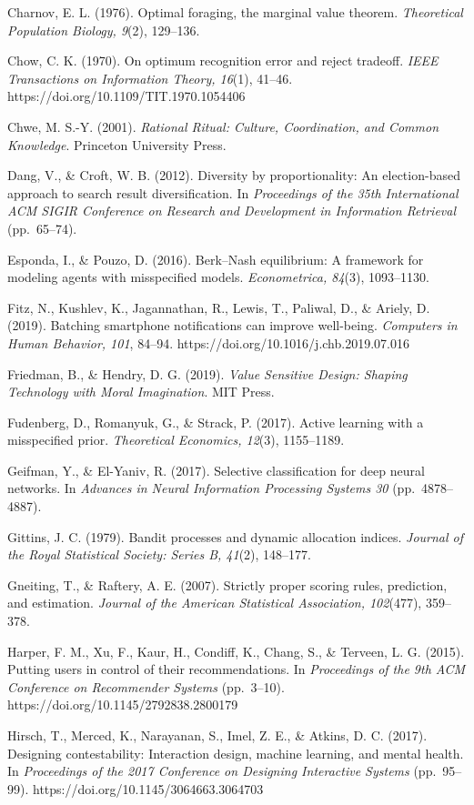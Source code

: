 \documentclass[
  11pt]{article}
\begin{document}
Charnov, E. L. (1976). Optimal foraging, the marginal value theorem.
\emph{Theoretical Population Biology, 9}(2), 129--136.

Chow, C. K. (1970). On optimum recognition error and reject tradeoff.
\emph{IEEE Transactions on Information Theory, 16}(1), 41--46.
https://doi.org/10.1109/TIT.1970.1054406

Chwe, M. S.-Y. (2001). \emph{Rational Ritual: Culture, Coordination, and
Common Knowledge}. Princeton University Press.

Dang, V., \& Croft, W. B. (2012). Diversity by proportionality: An
election-based approach to search result diversification. In
\emph{Proceedings of the 35th International ACM SIGIR Conference on
Research and Development in Information Retrieval} (pp.~65--74).

Esponda, I., \& Pouzo, D. (2016). Berk--Nash equilibrium: A framework
for modeling agents with misspecified models. \emph{Econometrica,
84}(3), 1093--1130.

Fitz, N., Kushlev, K., Jagannathan, R., Lewis, T., Paliwal, D., \&
Ariely, D. (2019). Batching smartphone notifications can improve
well-being. \emph{Computers in Human Behavior, 101}, 84--94.
https://doi.org/10.1016/j.chb.2019.07.016

Friedman, B., \& Hendry, D. G. (2019). \emph{Value Sensitive Design:
Shaping Technology with Moral Imagination}. MIT Press.

Fudenberg, D., Romanyuk, G., \& Strack, P. (2017). Active learning with
a misspecified prior. \emph{Theoretical Economics, 12}(3), 1155--1189.

Geifman, Y., \& El-Yaniv, R. (2017). Selective classification for deep
neural networks. In \emph{Advances in Neural Information Processing
Systems 30} (pp.~4878--4887).

Gittins, J. C. (1979). Bandit processes and dynamic allocation indices.
\emph{Journal of the Royal Statistical Society: Series B, 41}(2),
148--177.

Gneiting, T., \& Raftery, A. E. (2007). Strictly proper scoring rules,
prediction, and estimation. \emph{Journal of the American Statistical
Association, 102}(477), 359--378.

Harper, F. M., Xu, F., Kaur, H., Condiff, K., Chang, S., \& Terveen, L.
G. (2015). Putting users in control of their recommendations. In
\emph{Proceedings of the 9th ACM Conference on Recommender Systems}
(pp.~3--10). https://doi.org/10.1145/2792838.2800179

Hirsch, T., Merced, K., Narayanan, S., Imel, Z. E., \& Atkins, D. C.
(2017). Designing contestability: Interaction design, machine learning,
and mental health. In \emph{Proceedings of the 2017 Conference on
Designing Interactive Systems} (pp.~95--99).
https://doi.org/10.1145/3064663.3064703
\end{document}
